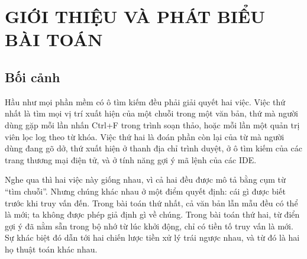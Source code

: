
\chapter{GIỚI THIỆU VÀ PHÁT BIỂU BÀI TOÁN}
\label{ch:1}

\section{Bối cảnh}
\label{sec:1-1}

Hầu như mọi phần mềm có ô tìm kiếm đều phải giải quyết hai việc. Việc
thứ nhất là tìm mọi vị trí xuất hiện của một chuỗi trong một văn bản,
thứ mà người dùng gặp mỗi lần nhấn Ctrl+F trong trình soạn thảo, hoặc
mỗi lần một quản trị viên lọc log theo từ khóa. Việc thứ hai là đoán
phần còn lại của từ mà người dùng đang gõ dở, thứ xuất hiện ở thanh địa
chỉ trình duyệt, ở ô tìm kiếm của các trang thương mại điện tử, và ở
tính năng gợi ý mã lệnh của các IDE.

Nghe qua thì hai việc này giống nhau, vì cả hai đều được mô tả bằng cụm
từ ``tìm chuỗi''. Nhưng chúng khác nhau ở một điểm quyết định: cái gì
được biết trước khi truy vấn đến. Trong bài toán thứ nhất, cả văn bản
lẫn mẫu đều có thể là mới; ta không được phép giả định gì về chúng.
Trong bài toán thứ hai, từ điển gợi ý đã nằm sẵn trong bộ nhớ từ lúc
khởi động, chỉ có tiền tố truy vấn là mới. Sự khác biệt đó dẫn tới hai
chiến lược tiền xử lý trái ngược nhau, và từ đó là hai họ thuật toán
khác nhau.

\begin{center}
\end{center}


